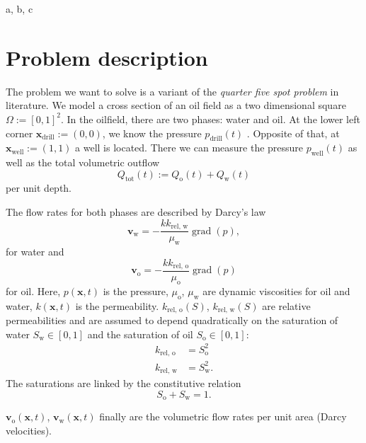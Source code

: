\documentclass[conference]{IEEEtran}
\DeclareMathOperator*{\grad}{grad}
\renewcommand*{\vec}[1]{\ensuremath{{\bm{#1}}}}
\begin{document}
\begin{IEEEkeywords}
a, b, c
\end{IEEEkeywords}

\section{Problem description}
The problem we want to solve is a variant of the \emph{quarter five spot problem} in literature.
We model a cross section of an oil field as a two dimensional square $\Omega := [0, 1]^2.$ In the oilfield, there are two phases: water and oil. 
At the lower left corner $\vec{x}_\text{drill} := (0, 0)$, we know the pressure $p_\text{drill}(t)$ . Opposite of that, at $\vec{x}_\text{well} := (1, 1)$ a well is located.
There we can measure the pressure $p_\text{well}(t)$ as well as the total volumetric outflow \[{Q}_\text{tot}(t) := {Q}_\text{o}(t) + {Q}_\text{w}(t)\] per unit depth.

The flow rates for both phases are described by Darcy's law
\begin{equation}
\label{flowrateWater}
\vec{v}_\text{w} = -\frac{k k_\text{rel, w}}{\mu_\text{w}} \grad(p),
\end{equation}
for water and
\begin{equation}
\label{flowrateOil}
\vec{v}_\text{o} = -\frac{k k_\text{rel, o}}{\mu_\text{o}} \grad(p)
\end{equation}
for oil.
Here, $p(\vec{x}, t)$ is the pressure, $\mu_\text{o}$, $\mu_\text{w}$ are dynamic viscosities for oil and water, $k(\vec{x}, t)$ is the permeability.
$k_\text{rel, o}(S)$, $k_\text{rel, w}(S)$ are relative permeabilities and are assumed to depend quadratically on the saturation of water $S_\text{w} \in [0, 1]$ and the saturation of oil $S_\text{o} \in [0, 1]$:
\begin{align}
\label{relativePermeabilityModel}
k_\text{rel, o} &= S_\text{o}^2\\
k_\text{rel, w} &= S_\text{w}^2.
\end{align}
The saturations are linked by the constitutive relation
\begin{equation}
S_\text{o} + S_\text{w} = 1.
\end{equation}

$\vec{v}_\text{o}(\vec{x}, t)$, $\vec{v}_\text{w}(\vec{x}, t)$ finally are the volumetric flow rates per unit area (Darcy velocities).
\end{document}
